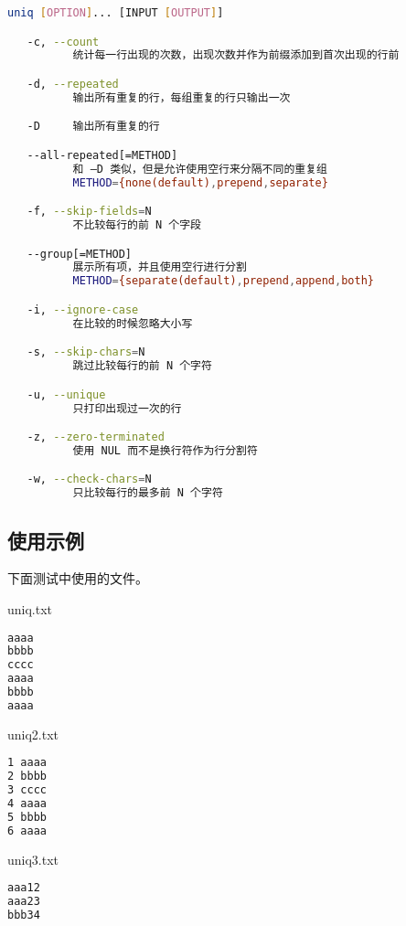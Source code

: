 \begin{lstlisting}[language=bash, numbersep=1em, numberstyle=\footnotesize , breaklines=true]
uniq [OPTION]... [INPUT [OUTPUT]]

   -c, --count
          统计每一行出现的次数，出现次数并作为前缀添加到首次出现的行前

   -d, --repeated
          输出所有重复的行，每组重复的行只输出一次

   -D     输出所有重复的行

   --all-repeated[=METHOD]
          和 —D 类似，但是允许使用空行来分隔不同的重复组
          METHOD={none(default),prepend,separate}

   -f, --skip-fields=N
          不比较每行的前 N 个字段

   --group[=METHOD]
          展示所有项，并且使用空行进行分割
          METHOD={separate(default),prepend,append,both}

   -i, --ignore-case
          在比较的时候忽略大小写

   -s, --skip-chars=N
          跳过比较每行的前 N 个字符

   -u, --unique
          只打印出现过一次的行

   -z, --zero-terminated
          使用 NUL 而不是换行符作为行分割符

   -w, --check-chars=N
          只比较每行的最多前 N 个字符
\end{lstlisting}

\subsection{使用示例}
下面测试中使用的文件。

uniq.txt
\begin{lstlisting}[language=bash, numbersep=1em, numberstyle=\footnotesize , breaklines=true]
aaaa
bbbb
cccc
aaaa
bbbb
aaaa
\end{lstlisting}

uniq2.txt
\begin{lstlisting}[language=bash, numbersep=1em, numberstyle=\footnotesize , breaklines=true]
1 aaaa
2 bbbb
3 cccc
4 aaaa
5 bbbb
6 aaaa
\end{lstlisting}

uniq3.txt
\begin{lstlisting}[language=bash, numbersep=1em, numberstyle=\footnotesize , breaklines=true]
aaa12
aaa23
bbb34
\end{lstlisting}

